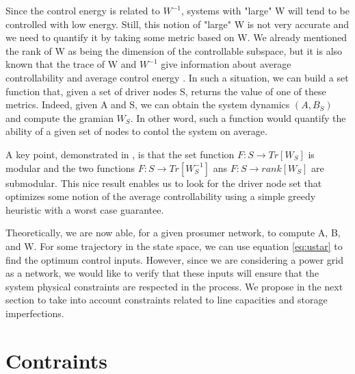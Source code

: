 \documentclass[conference]{IEEEtran}
\begin{document}
Since the control energy is related to $ W^{-1} $, systems with "large" W will tend to be controlled with low energy. Still, this notion of "large" W is not very accurate and we need to quantify it by taking some metric based on W. We already mentioned the rank of W as being the dimension of the controllable subspace, but it is also known that the trace of W and $W^{-1}$ give information about average controllability and average control energy \cite{Summers2014}. In such a situation, we can build a set function that, given a set of driver nodes S, returns the value of one of these metrics. Indeed, given A and S, we can obtain the system dynamics $(A,B_S)$ and compute the gramian $W_S$. In other word, such a function would quantify the ability of a given set of nodes to contol the system on average.

A key point, demonstrated in \cite{Summers2014}, is that the set function $ F:S \longrightarrow Tr[W_S] $ is modular and the two functions $F:S \longrightarrow Tr[W^{-1}_S] $ ans $ F:S \longrightarrow rank[W_S] $ are submodular. This nice result enables us to look for the driver node set that optimizes some notion of the average controllability using a simple greedy heuristic with a worst case guarantee.

Theoretically, we are now able, for a given prosumer network, to compute A, B, and W. For some trajectory in the state space, we can use equation \ref{eq:ustar} to find the optimum control inputs. However, since we are considering a power grid as a network, we would like to verify that these inputs will ensure that the system physical constraints are respected in the process. We propose in the next section to take into account constraints related to line capacities and storage imperfections.



\section{Contraints}
\label{sec:constraints}

\end{document}
